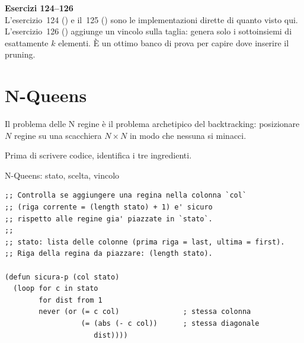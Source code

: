 \begin{workbook}
\textbf{Esercizi 124--126}\\[4pt]
L'esercizio~124 () e il~125 () sono
le implementazioni dirette di quanto visto qui.
L'esercizio~126 () aggiunge un vincolo
sulla taglia: genera solo i sottoinsiemi di esattamente $k$ elementi.
È un ottimo banco di prova per capire dove inserire il pruning.
\end{workbook}

\section{N-Queens}

Il problema delle N regine è il problema archetipico
del backtracking: posizionare $N$ regine su una scacchiera
$N \times N$ in modo che nessuna si minacci.


Prima di scrivere codice, identifica i tre ingredienti.

\begin{concetto}{N-Queens: stato, scelta, vincolo}

\boxsep
{}
\end{concetto}


\begin{esempio}
\begin{lstlisting}
;; Controlla se aggiungere una regina nella colonna `col`
;; (riga corrente = (length stato) + 1) e' sicuro
;; rispetto alle regine gia' piazzate in `stato`.
;;
;; stato: lista delle colonne (prima riga = last, ultima = first).
;; Riga della regina da piazzare: (length stato).

(defun sicura-p (col stato)
  (loop for c in stato
        for dist from 1
        never (or (= c col)               ; stessa colonna
                  (= (abs (- c col))      ; stessa diagonale
                     dist))))
\end{lstlisting}
\end{esempio}


